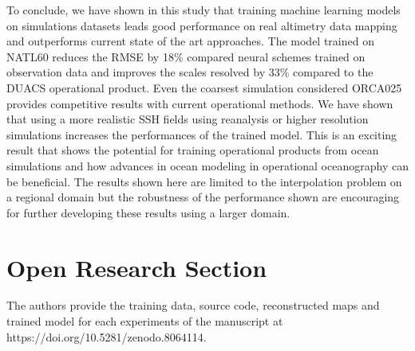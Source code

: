\begin{bibunit}
To conclude, we have shown in this study that training machine learning models on simulations datasets leads good performance on real altimetry data mapping and outperforms current state of the art approaches. The model trained on NATL60 reduces the RMSE by 18\% compared neural schemes trained on observation data and improves the scales resolved by 33\% compared to the DUACS operational product. Even the coarsest simulation considered ORCA025 provides competitive results with current operational methods. We have shown that using a more realistic SSH fields using reanalysis or higher resolution simulations increases the performances of the trained model. This is an exciting result that shows the potential for training operational products from ocean simulations and how advances in ocean modeling in operational oceanography can be beneficial. The results shown here are limited to the interpolation problem on a regional domain but the robustness of the performance shown are encouraging for further developing these results using a larger domain.



\section*{Open Research Section}
The authors provide the training data, source code, reconstructed maps and trained model for each experiments of the manuscript at https://doi.org/10.5281/zenodo.8064114.





% 

\end{bibunit}
% 






